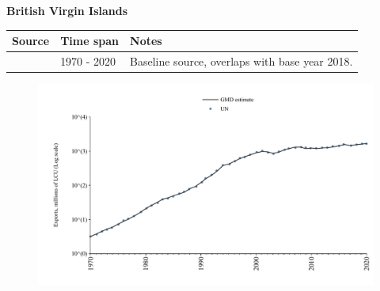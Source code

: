 \documentclass[12pt,a4paper,landscape]{article}
\begin{document}
\begin{adjustbox}{max totalsize={\paperwidth}{\paperheight},center}
\begin{minipage}[t][\textheight][t]{\textwidth}
\vspace*{0.5cm}
{}
\begin{center}
{\Large\bfseries British Virgin Islands}
\end{center}
\vspace{0.5cm}
\begin{table}[H]
\centering
\small
\begin{tabular}{|l|l|l|}
\hline
\textbf{Source} & \textbf{Time span} & \textbf{Notes} \\
\hline
\rowcolor{white}\cite{UN}& 1970 - 2020 &Baseline source, overlaps with base year 2018.\\
\hline
\end{tabular}
\end{table}
\begin{figure}[H]
\centering
\includegraphics[width=\textwidth,height=0.6\textheight,keepaspectratio]{graphs/VGB_exports.pdf}
\end{figure}
\end{minipage}
\end{adjustbox}
\end{document}
